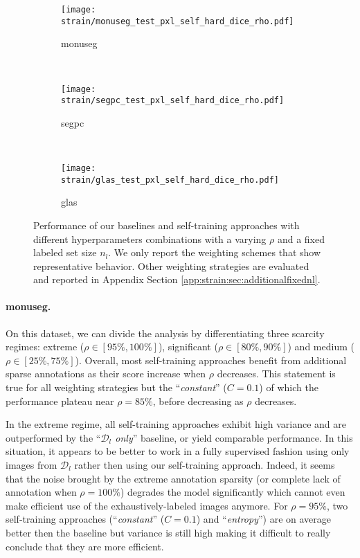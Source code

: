 \begin{figure}[th]
  \centering
    \begin{subfigure}{\textwidth}
    \centering
    \texttt{[image: strain/monuseg\_test\_pxl\_self\_hard\_dice\_rho.pdf]}
    \caption{\acrshort{monuseg}}
      \label{fig:strain:rho_exp_monuseg}
  \end{subfigure} \\
  \begin{subfigure}{\textwidth}
    \centering
    \texttt{[image: strain/segpc\_test\_pxl\_self\_hard\_dice\_rho.pdf]}
    \caption{\acrshort{segpc}}
    \label{fig:strain:rho_exp_segpc}
  \end{subfigure} \\
  \begin{subfigure}{\textwidth}
    \centering
    \texttt{[image: strain/glas\_test\_pxl\_self\_hard\_dice\_rho.pdf]}
    \caption{\acrshort{glas}}
    \label{fig:strain:rho_exp_glas}
  \end{subfigure}
  \caption{Performance of our baselines and self-training approaches with different hyperparameters combinations with a varying $\rho$ and a fixed labeled set size $n_l$. We only report the weighting schemes that show representative behavior. Other weighting strategies are evaluated and reported in Appendix Section \ref{app:strain:sec:additionalfixednl}.}
  \label{fig:strain:rho_exp}
\end{figure}

\paragraph{\acrshort{monuseg}.} On this dataset, we can divide the analysis by differentiating three scarcity regimes: extreme ($\rho \in [95\%, 100\%]$), significant ($\rho \in [80\%, 90\%]$) and medium ($\rho \in [25\%, 75\%]$). Overall, most self-training approaches benefit from additional sparse annotations as their score increase when $\rho$ decreases. This statement is true for all weighting strategies but the ``\textit{constant}'' ($C = 0.1$) of which the performance plateau near $\rho = 85\%$, before decreasing as $\rho$ decreases. 

In the extreme regime, all self-training approaches exhibit high variance and are outperformed by the ``\textit{$\mathcal{D}_l$ only}'' baseline, or yield comparable performance. In this situation, it appears to be better to work in a fully supervised fashion using only images from $\mathcal{D}_l$ rather then using our self-training approach. Indeed, it seems that the noise brought by the extreme annotation sparsity (or complete lack of annotation when $\rho = 100\%$) degrades the model significantly which cannot even make efficient use of the exhaustively-labeled images anymore. For $\rho = 95\%$, two self-training approaches (``\textit{constant}'' ($C = 0.1$) and ``\textit{entropy}'') are on average better then the baseline but variance is still high making it difficult to really conclude that they are more efficient. 

